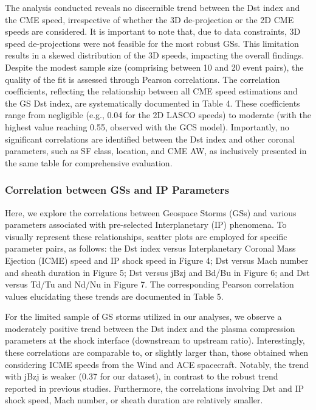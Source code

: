 The analysis conducted reveals no discernible trend between the Dst index and the CME speed, irrespective of whether the 3D de-projection or the 2D CME speeds are considered. It is important to note that, due to data constraints, 3D speed de-projections were not feasible for the most robust GSs. This limitation results in a skewed distribution of the 3D speeds, impacting the overall findings. Despite the modest sample size (comprising between 10 and 20 event pairs), the quality of the fit is assessed through Pearson correlations. The correlation coefficients, reflecting the relationship between all CME speed estimations and the GS Dst index, are systematically documented in Table 4. These coefficients range from negligible (e.g., 0.04 for the 2D LASCO speeds) to moderate (with the highest value reaching 0.55, observed with the GCS model). Importantly, no significant correlations are identified between the Dst index and other coronal parameters, such as SF class, location, and CME AW, as inclusively presented in the same table for comprehensive evaluation.

\subsubsection{Correlation between GSs and IP Parameters}
Here, we explore the correlations between Geospace Storms (GSs) and various parameters associated with pre-selected Interplanetary (IP) phenomena. To visually represent these relationships, scatter plots are employed for specific parameter pairs, as follows: the Dst index versus Interplanetary Coronal Mass Ejection (ICME) speed and IP shock speed in Figure 4; Dst versus Mach number and sheath duration in Figure 5; Dst versus jBzj and Bd/Bu in Figure 6; and Dst versus Td/Tu and Nd/Nu in Figure 7. The corresponding Pearson correlation values elucidating these trends are documented in Table 5.

For the limited sample of GS storms utilized in our analyses, we observe a moderately positive trend between the Dst index and the plasma compression parameters at the shock interface (downstream to upstream ratio). Interestingly, these correlations are comparable to, or slightly larger than, those obtained when considering ICME speeds from the Wind and ACE spacecraft. Notably, the trend with jBzj is weaker (0.37 for our dataset), in contrast to the robust trend reported in previous studies. Furthermore, the correlations involving Dst and IP shock speed, Mach number, or sheath duration are relatively smaller.

